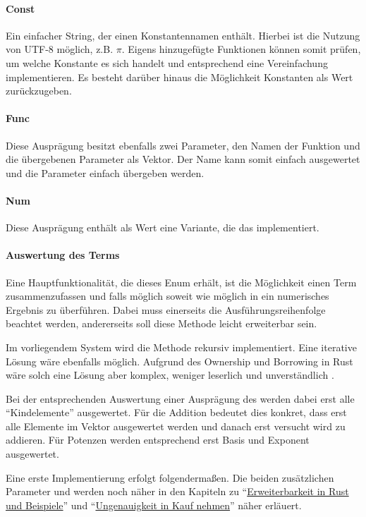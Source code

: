 \documentclass[11pt,a4paper, ngerman]{article}
\begin{document}
\paragraph{Const} Ein einfacher String, der einen Konstantennamen enthält. Hierbei ist die Nutzung von UTF-8 möglich, z.B. $\pi$. Eigens hinzugefügte Funktionen können somit prüfen, um welche Konstante es sich handelt und entsprechend eine Vereinfachung implementieren. Es besteht darüber hinaus die Möglichkeit Konstanten als Wert zurückzugeben.

\paragraph{Func} Diese Ausprägung besitzt ebenfalls zwei Parameter, den Namen der Funktion und die übergebenen Parameter als Vektor. Der Name kann somit einfach ausgewertet und die Parameter einfach übergeben werden.

\paragraph{Num} Diese Ausprägung enthält als Wert eine Variante, die das   implementiert.

\paragraph{Auswertung des Terms} Eine Hauptfunktionalität, die dieses Enum erhält, ist die Möglichkeit einen Term zusammenzufassen und falls möglich soweit wie möglich in ein numerisches Ergebnis zu überführen. Dabei muss einerseits die Ausführungsreihenfolge beachtet werden, andererseits soll diese Methode leicht erweiterbar sein.

Im vorliegendem System wird die Methode rekursiv implementiert. Eine iterative Lösung wäre ebenfalls möglich. Aufgrund des Ownership und Borrowing in Rust wäre solch eine Lösung aber komplex, weniger leserlich und unverständlich \cite{RustRecToItAst}.

Bei der entsprechenden Auswertung einer Ausprägung des  werden dabei erst alle ``Kindelemente'' ausgewertet. Für die Addition bedeutet dies konkret, dass erst alle Elemente im Vektor ausgewertet werden und danach erst versucht wird zu addieren. Für Potenzen werden entsprechend erst Basis und Exponent ausgewertet.

Eine erste Implementierung erfolgt folgendermaßen. Die beiden zusätzlichen Parameter  und  werden noch näher in den Kapiteln zu ``\hyperref[sec:kapErRustUndBei]{Erweiterbarkeit in Rust und Beispiele}'' und ``\hyperref[sec:ungenauigkeitenKapitel]{Ungenauigkeit in Kauf nehmen}'' näher erläuert.
\end{document}
